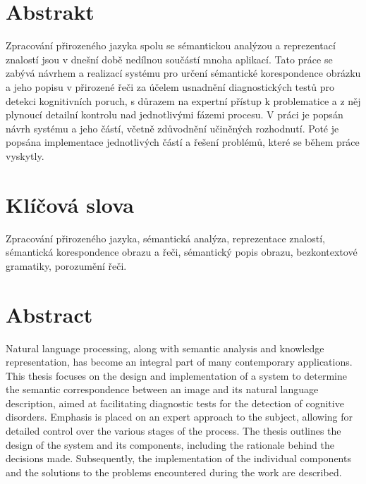 \section*{Abstrakt}
Zpracování přirozeného jazyka spolu se sémantickou analýzou a reprezentací znalostí jsou v dnešní době nedílnou součástí mnoha aplikací.
Tato práce se zabývá návrhem a realizací systému pro určení sémantické korespondence obrázku a jeho popisu v přirozené řeči
za účelem usnadnění diagnostických testů pro detekci kognitivních poruch, s důrazem na expertní přístup k problematice a z něj
plynoucí detailní kontrolu nad jednotlivými fázemi procesu.
V práci je popsán návrh systému a jeho částí, včetně zdůvodnění učiněných rozhodnutí.
Poté je popsána implementace jednotlivých částí a řešení problémů, které se během práce vyskytly.

\section*{Klíčová slova}
Zpracování přirozeného jazyka, sémantická analýza, reprezentace znalostí, sémantická korespondence obrazu a řeči, sémantický popis obrazu,
bezkontextové gramatiky, porozumění řeči.

\thispagestyle{empty}
\newpage

\section*{Abstract}
Natural language processing, along with semantic analysis and knowledge representation, has become an integral part of many contemporary applications.
This thesis focuses on the design and implementation of a system to determine the semantic correspondence between an image and its natural language description,
aimed at facilitating diagnostic tests for the detection of cognitive disorders.
Emphasis is placed on an expert approach to the subject, allowing for detailed control over the various stages of the process.
The thesis outlines the design of the system and its components,
including the rationale behind the decisions made.
Subsequently, the implementation of the individual components and the solutions to the problems encountered during the work are described.

